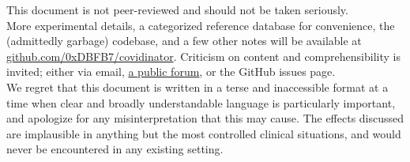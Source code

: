 \documentclass[paper.tex]{subfiles}
\begin{document}
\begin{abstract}
%	
%	
%	
%	
%	
%	
%	
\end{abstract}

\begin{tcolorbox}
\noindent \small{This document is not peer-reviewed and should not be taken seriously.\\
	
More experimental details, a categorized reference database for convenience, the (admittedly garbage) codebase, and a few other notes will be available at 
\href{https://www.github.com/0xDBFB7/covidinator}{github.com/0xDBFB7/covidinator}. Criticism on content and comprehensibility is invited; either via email, \href{https://forum.0xdbfb7.com/t/discussion-on-covidinator/19}{a public forum}, or the GitHub issues page. \\

We regret that this document is written in a terse and inaccessible format at a time when clear and broadly understandable language is particularly important\cite{Re2021}, and apologize for any misinterpretation that this may cause. The effects discussed are implausible in anything but the most controlled clinical situations, and would never be encountered in any existing setting.

}
\end{tcolorbox}
\clearpage
\end{document}
